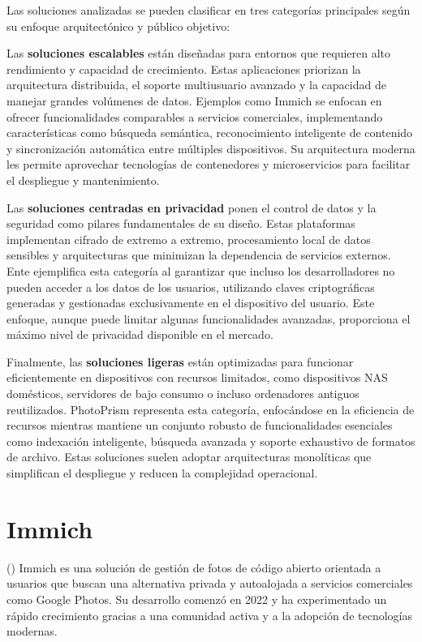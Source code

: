 Las soluciones analizadas se pueden clasificar en tres categorías principales según su enfoque arquitectónico y público objetivo:

Las \textbf{soluciones escalables} están diseñadas para entornos que requieren alto rendimiento y capacidad de crecimiento. Estas aplicaciones priorizan la arquitectura distribuida, el soporte multiusuario avanzado y la capacidad de manejar grandes volúmenes de datos. Ejemplos como Immich se enfocan en ofrecer funcionalidades comparables a servicios comerciales, implementando características como búsqueda semántica, reconocimiento inteligente de contenido y sincronización automática entre múltiples dispositivos. Su arquitectura moderna les permite aprovechar tecnologías de contenedores y microservicios para facilitar el despliegue y mantenimiento.

Las \textbf{soluciones centradas en privacidad} ponen el control de datos y la seguridad como pilares fundamentales de su diseño. Estas plataformas implementan cifrado de extremo a extremo, procesamiento local de datos sensibles y arquitecturas que minimizan la dependencia de servicios externos. Ente ejemplifica esta categoría al garantizar que incluso los desarrolladores no pueden acceder a los datos de los usuarios, utilizando claves criptográficas generadas y gestionadas exclusivamente en el dispositivo del usuario. Este enfoque, aunque puede limitar algunas funcionalidades avanzadas, proporciona el máximo nivel de privacidad disponible en el mercado.

Finalmente, las \textbf{soluciones ligeras} están optimizadas para funcionar eficientemente en dispositivos con recursos limitados, como dispositivos NAS domésticos, servidores de bajo consumo o incluso ordenadores antiguos reutilizados. PhotoPrism representa esta categoría, enfocándose en la eficiencia de recursos mientras mantiene un conjunto robusto de funcionalidades esenciales como indexación inteligente, búsqueda avanzada y soporte exhaustivo de formatos de archivo. Estas soluciones suelen adoptar arquitecturas monolíticas que simplifican el despliegue y reducen la complejidad operacional.


\section{Immich}

(\cite{immich-documentation}) Immich es una solución de gestión de fotos de código abierto orientada a usuarios que buscan una alternativa privada y autoalojada a servicios comerciales como Google Photos. Su desarrollo comenzó en 2022 y ha experimentado un rápido crecimiento gracias a una comunidad activa y a la adopción de tecnologías modernas.

